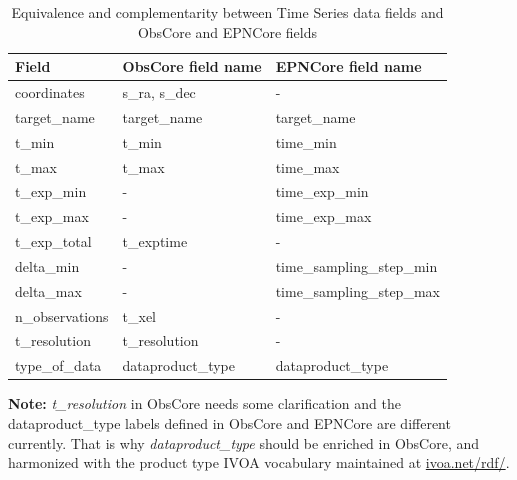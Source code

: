 \documentclass[11pt,a4paper]{ivoa}
\begin{document}
\begin{table}[!htb]
  \begin{center}
  \begin{small}
  \caption{Equivalence and complementarity between Time Series data fields and ObsCore and EPNCore fields}
   \label{tab:obs_epn}
  \begin{tabular}{|l|l|l|}
\hline
    \textbf{Field}      & \textbf{ObsCore field name} & \textbf{EPNCore field name}  \\%
\hline
    coordinates     & s\_ra, s\_dec          & -                         \\
    \hline
    target\_name    & target\_name           & target\_name              \\
    \hline
    t\_min          & t\_min                 & time\_min                 \\
    \hline
    t\_max          & t\_max                 & time\_max                 \\
    \hline
    t\_exp\_min     &  -                     & time\_exp\_min            \\
    \hline
    t\_exp\_max     &  -                     & time\_exp\_max            \\
    \hline
    t\_exp\_total   &  t\_exptime              & -                         \\
    \hline
    delta\_min      &  -                     & time\_sampling\_step\_min \\
    \hline
    delta\_max      &  -                     & time\_sampling\_step\_max \\
    \hline
    n\_observations & t\_xel                 & -                         \\
    \hline
     t\_resolution   & t\_resolution      & -                         \\
    type\_of\_data  & dataproduct\_type & dataproduct\_type         \\
\hline
  \end{tabular}
  \end{small}

  \end{center}
 \end{table}

\textbf{ Note:}  \emph{t\_resolution} in ObsCore needs some clarification and the dataproduct\_type labels defined in ObsCore and EPNCore are different currently.
That is why \emph{dataproduct\_type} should be enriched in ObsCore, and harmonized with the product type IVOA vocabulary maintained at \url{ivoa.net/rdf/}.
\end{document}

